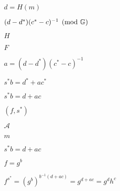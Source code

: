 \documentclass[10pt]{book}
\begin{document}
\begin{mdSnippets}
\begin{mdInlineSnippet}%
$d = H(m)$\end{mdInlineSnippet}%
\begin{mdInlineSnippet}%
$(d-d^*)(c^* - c)^{-1} \pmod{\mathbb{G}}$\end{mdInlineSnippet}%
\begin{mdInlineSnippet}[c1d9f50f86825a1a2302ec2449c17196]%
$H$\end{mdInlineSnippet}%
\begin{mdInlineSnippet}[800618943025315f869e4e1f09471012]%
$F$\end{mdInlineSnippet}%
\begin{mdInlineSnippet}[a29582f37b37056784cc64eea8b83d93]%
$a = (d-d^*)(c^* - c)^{-1}$\end{mdInlineSnippet}%
\begin{mdInlineSnippet}%
$s^*b = d^* + ac^*$\end{mdInlineSnippet}%
\begin{mdInlineSnippet}[4d61ea1576a179e49f4a6d70acb0f108]%
$s^*b = d + ac$\end{mdInlineSnippet}%
\begin{mdInlineSnippet}[6bb88234af389d7432e135ad3d41fd2c]%
$(f,s^*)$\end{mdInlineSnippet}%
\begin{mdInlineSnippet}[ad70146b431bea9ae74cf8385470c544]%
$\mathcal{A}$\end{mdInlineSnippet}%
\begin{mdInlineSnippet}[6f8f57715090da2632453988d9a1501b]%
$m$\end{mdInlineSnippet}%
\begin{mdInlineSnippet}[4d61ea1576a179e49f4a6d70acb0f108]%
$s^*b = d + ac$\end{mdInlineSnippet}%
\begin{mdInlineSnippet}[ccbecf07374dd1b071330613139b9a07]%
$f = g^b$\end{mdInlineSnippet}%
\begin{mdInlineSnippet}[4b0b490f3e96f1bc999ef3b4c6aaee1d]%
$f^{s^*} = (g^b)^{b^{-1}(d + ac)} = g^{d+ac} = g^dh^c$\end{mdInlineSnippet}%

\end{mdSnippets}
\end{document}
